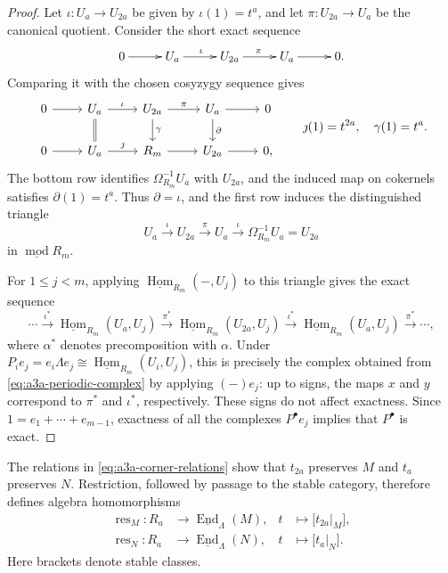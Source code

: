 \documentclass[a4paper,11pt,reqno]{amsart}
\theoremstyle{definition}
\theoremstyle{plain}
\numberwithin{equation}{section}
\newcommand{\Hom}{\operatorname{Hom}}
\newcommand{\End}{\operatorname{End}}
\begin{document}
\begin{proof}
Let \(\iota:U_a\to U_{2a}\) be given by \(\iota(1)=t^a\), and let
\(\pi:U_{2a}\to U_a\) be the canonical quotient.  Consider the short exact
sequence
\begin{equation*}
\xymatrix@C=2.2pc{
0\ar[r]&U_a\ar[r]^{\iota}&U_{2a}\ar[r]^{\pi}&U_a\ar[r]&0.
}
\end{equation*}
Comparing it with the chosen cosyzygy sequence gives
\[
\begin{tikzcd}[column sep=2.4em]
0\arrow[r]&U_a\arrow[r,"\iota"]\arrow[d,equal]&
U_{2a}\arrow[r,"\pi"]\arrow[d,"\gamma"]&
U_a\arrow[r]\arrow[d,"\partial"]&0\\
0\arrow[r]&U_a\arrow[r,"\jmath"]&
R_m\arrow[r]&U_{2a}\arrow[r]&0,
\end{tikzcd}
\qquad
\jmath(1)=t^{2a},\quad \gamma(1)=t^a.
\]
The bottom row identifies \(\Omega^{-1}_{R_m}U_a\) with \(U_{2a}\), and
the induced map on cokernels satisfies \(\partial(1)=t^a\).  Thus
\(\partial=\iota\), and the first row induces the distinguished triangle
\[
 U_a\xrightarrow{\iota}U_{2a}\xrightarrow{\pi}U_a
 \xrightarrow{\iota}\Omega^{-1}_{R_m}U_a=U_{2a}
\]
in \(\underline{\operatorname{mod}}R_m\).

For \(1\le j<m\), applying
\(\underline{\Hom}_{R_m}(-,U_j)\) to this triangle gives the exact
sequence
\[
 \cdots\xrightarrow{\iota^*}\underline{\Hom}_{R_m}(U_a,U_j)
 \xrightarrow{\pi^*}\underline{\Hom}_{R_m}(U_{2a},U_j)
 \xrightarrow{\iota^*}\underline{\Hom}_{R_m}(U_a,U_j)
 \xrightarrow{\pi^*}\cdots,
\]
where \(\alpha^*\) denotes precomposition with \(\alpha\).  Under
\(P_i e_j=e_i\Lambda e_j\cong
\underline{\Hom}_{R_m}(U_i,U_j)\), this is precisely the complex obtained
from \eqref{eq:a3a-periodic-complex} by applying \((-)e_j\): up to signs,
the maps \(x\) and \(y\) correspond to \(\pi^*\) and \(\iota^*\),
respectively.  These signs do not affect exactness.  Since
\(1=e_1+\cdots+e_{m-1}\), exactness of all the complexes
\(P^\bullet e_j\) implies that \(P^\bullet\) is exact.
\end{proof}

The relations in \eqref{eq:a3a-corner-relations} show that \(t_{2a}\)
preserves \(M\) and \(t_a\) preserves \(N\).  Restriction, followed by
passage to the stable category, therefore defines algebra homomorphisms
\begin{equation}
\label{eq:a3a-stable-homs}
\begin{aligned}
 \operatorname{res}_M:R_a&\longrightarrow
 \underline{\End}_\Lambda(M),
 &t&\longmapsto\bigl[t_{2a}|_M\bigr],\\
 \operatorname{res}_N:R_a&\longrightarrow
 \underline{\End}_\Lambda(N),
 &t&\longmapsto\bigl[t_a|_N\bigr].
\end{aligned}
\end{equation}
Here brackets denote stable classes.
\end{document}

